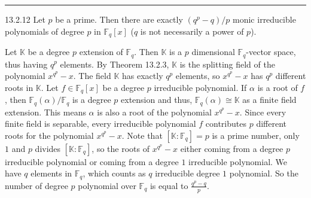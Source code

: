 \documentclass[a4paper, 12pt]{article}
\begin{document}
\noindent\rule{7in}{2.8pt}
\begin{problem}{13.2.12}
Let \(p\) be a prime. Then there are exactly \((q^p-q)/p\) monic irreducible polynomials of degree \(p\) in \(\mathbb{F}_q[x]\) (\(q\) is not necessarily a power of \(p\)).
\end{problem}
\begin{solution}
Let \(\mathbb{K}\) be a degree \(p\) extension of \(\mathbb{F}_q\). Then \(\mathbb{K}\) is a \(p\) dimensional \(\mathbb{F}_q\)-vector space, thus having \(q^p\) elements. By Theorem 13.2.3, \(\mathbb{K}\) is the splitting field of the polynomial \(x^{q^p}-x\). The field \(\mathbb{K}\) has exactly 
\(q^p\) elements, so \(x^{q^p}-x\) has \(q^p\) different roots in \(\mathbb{K}\). Let \(f\in \mathbb{F}_q[x]\) be a degree \(p\) irreducible polynomial. If \(\alpha\) is a root of \(f\), then \(\mathbb{F}_q(\alpha)/\mathbb{F}_q\) is a degree \(p\) extension and thus, \(\mathbb{F}_q(\alpha)\cong \mathbb{K}\) 
as a finite field extension. This means \(\alpha\) is also a root of the polynomial \(x^{q^p}-x\). Since every finite field is separable, every irreducible polynomial \(f\) contributes \(p\) different roots for the polynomial \(x^{q^p}-x\). Note that \([\mathbb{K}:\mathbb{F}_q]=p\) is a prime number, only \(1\) and \(p\) divides \([\mathbb{K}:\mathbb{F}_q]\), so 
the roots of \(x^{q^p}-x\) either coming from a degree \(p\) irreducible polynomial or coming from a degree \(1\) irreducible polynomial. We have \(q\) elements in \(\mathbb{F}_q\), which counts as \(q\) irreducible degree \(1\) polynomial. So the number of degree \(p\) polynomial over \(\mathbb{F}_q\) is equal to \(\frac{q^p-q}{p}\).  
\end{solution}
\end{document}
